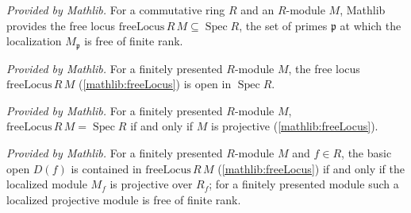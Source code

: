 \begin{definition}
  \label{mathlib:freeLocus}
  \mathlibok
  \textit{Provided by Mathlib.}
  For a commutative ring \(R\) and an \(R\)-module \(M\), Mathlib provides the free
  locus \(\mathrm{freeLocus}\,R\,M\subseteq\operatorname{Spec}R\), the set of primes
  \(\mathfrak p\) at which the localization \(M_{\mathfrak p}\) is free of finite
  rank.
\end{definition}

\begin{lemma}
  \label{mathlib:isOpen_freeLocus}
  \mathlibok
  \textit{Provided by Mathlib.}
  For a finitely presented \(R\)-module \(M\), the free locus
  \(\mathrm{freeLocus}\,R\,M\) (\cref{mathlib:freeLocus}) is open in
  \(\operatorname{Spec}R\).
\end{lemma}

\begin{lemma}
  \label{mathlib:freeLocus_eq_univ_iff}
  \mathlibok
  \textit{Provided by Mathlib.}
  For a finitely presented \(R\)-module \(M\),
  \(\mathrm{freeLocus}\,R\,M=\operatorname{Spec}R\) if and only if \(M\) is
  projective (\cref{mathlib:freeLocus}).
\end{lemma}

\begin{lemma}
  \label{mathlib:basicOpen_subset_freeLocus_iff}
  \mathlibok
  \textit{Provided by Mathlib.}
  For a finitely presented \(R\)-module \(M\) and \(f\in R\), the basic open
  \(D(f)\) is contained in \(\mathrm{freeLocus}\,R\,M\) (\cref{mathlib:freeLocus})
  if and only if the localized module \(M_f\) is projective over \(R_f\); for a
  finitely presented module such a localized projective module is free of finite
  rank.
\end{lemma}


